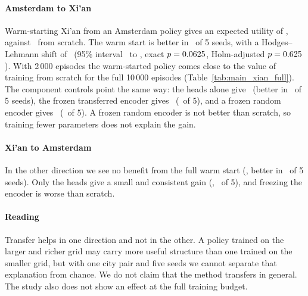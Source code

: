


\paragraph{Amsterdam to Xi'an} Warm-starting Xi'an from an Amsterdam policy gives an expected utility of \TrAmsXianFullEum, against \TrAmsXianScratchEum\ from scratch. The warm start is better in \TrAmsXianFullWins\ of 5 seeds, with a Hodges--Lehmann shift of \TrAmsXianFullHl\ (95\% interval \TrAmsXianFullHlLo\ to \TrAmsXianFullHlHi, exact $p=0.0625$, Holm-adjusted $p=0.625$). With 2\,000 episodes the warm-started policy comes close to the value of training from scratch for the full 10\,000 episodes (Table~\ref{tab:main_xian_full}). The component controls point the same way: the heads alone give \TrAmsXianHeadsDiff\ (better in \TrAmsXianHeadsWins\ of 5 seeds), the frozen transferred encoder gives \TrAmsXianFrozenTransferredDiff\ (\TrAmsXianFrozenTransferredWins\ of 5), and a frozen random encoder gives \TrAmsXianFrozenRandomDiff\ (\TrAmsXianFrozenRandomWins\ of 5). A frozen random encoder is not better than scratch, so training fewer parameters does not explain the gain.

\paragraph{Xi'an to Amsterdam} In the other direction we see no benefit from the full warm start (\TrXianAmsFullDiff, better in \TrXianAmsFullWins\ of 5 seeds). Only the heads give a small and consistent gain (\TrXianAmsHeadsDiff, \TrXianAmsHeadsWins\ of 5), and freezing the encoder is worse than scratch.

\paragraph{Reading} Transfer helps in one direction and not in the other. A policy trained on the larger and richer grid may carry more useful structure than one trained on the smaller grid, but with one city pair and five seeds we cannot separate that explanation from chance. We do not claim that the method transfers in general. The study also does not show an effect at the full training budget.
